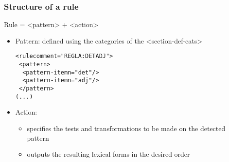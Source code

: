 \documentclass[10pt,xetex]{beamer} %
\begin{document}
\begin{frame}
\frametitle{Structure of a rule} %

Rule = <pattern> + <action>
\begin{itemize}
\item Pattern: defined using the categories of the <section-def-cats>
\begin{exampleblock}{}
\begin{small}
 \begin{alltt}
   <rule comment="REGLA: DET ADJ">\\
   ~ <pattern>\\
   ~~	<pattern-item n="det"/>\\
   ~~	<pattern-item n="adj"/>\\
   ~     </pattern>\\
(...)
 \end{alltt}
\end{small}
\end{exampleblock}
\item Action: 
\begin{itemize}
\item specifies the tests and transformations to be made on the detected pattern
\item outputs the resulting lexical forms in the desired order
\end{itemize}
\end{itemize}
\end{frame}
\end{document}
